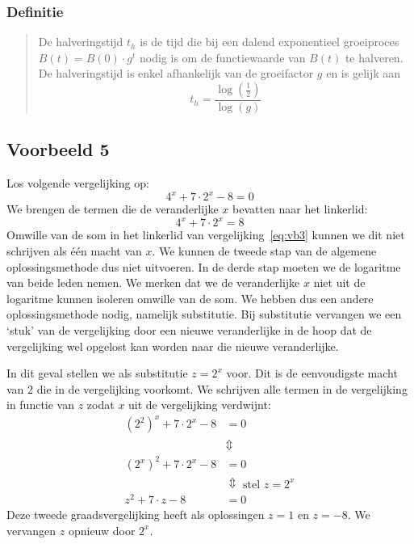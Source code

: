  \subsubsection{Definitie}
 \begin{quote}
 De halveringstijd $t_h$ is de tijd die bij een dalend exponentieel groeiproces $B(t)=B(0)\cdot g^t$ nodig is  om  de functiewaarde van $B(t)$ te halveren.
 De halveringstijd is enkel afhankelijk van de groeifactor $g$ en is gelijk aan 
 \begin{displaymath}
     t_{h}=\frac{\log(\frac{1}{2})}{\log(g)}
 \end{displaymath} 
 \end{quote}


\subsection{Voorbeeld 5}

Los volgende vergelijking op:
\begin{equation}
    4^{x}+7\cdot 2^{x}-8=0
\label{eq:vb3}
\end{equation}
We brengen de termen die de veranderlijke $x$ bevatten naar het linkerlid:
\begin{equation*}
4^x+7\cdot 2^x=8
\end{equation*}
Omwille van de som in het linkerlid van vergelijking~\eqref{eq:vb3} kunnen we dit niet schrijven als \'e\'en macht van $x$. We kunnen de tweede stap van de algemene oplossingsmethode dus niet uitvoeren. In de derde stap moeten we de logaritme van beide leden nemen. We merken dat we de veranderlijke $x$ niet uit de logaritme kunnen isoleren omwille van de som. We hebben dus een andere oplossingsmethode nodig, namelijk substitutie. Bij substitutie vervangen we een `stuk' van de vergelijking door een nieuwe veranderlijke in de hoop dat de vergelijking wel opgelost kan worden naar die nieuwe veranderlijke. 

In dit geval stellen we als substitutie $z=2^x$ voor.
Dit is de eenvoudigste
macht van 2 die in de vergelijking voorkomt.
We schrijven alle termen in de vergelijking in functie van $z$
zodat $x$ uit de vergelijking verdwijnt:
\begin{align*}
    \left(2^{2}\right)^{x}+7\cdot2^{x}-8 &= 0  \\
     &\Updownarrow  \\
    \left(2^{x}\right)^{2}+7\cdot2^{x}-8 &=  0  \\
     &\Updownarrow \text{ stel } z=2^x \\
    z^{2}+7\cdot z-8 &= 0
\end{align*}
Deze tweede graadsvergelijking heeft als oplossingen $z=1$ en $z=-8$.
We vervangen $z$ opnieuw door $2^{x}$. 

